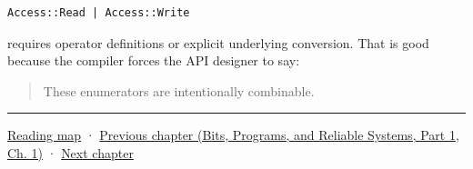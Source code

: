 \begin{verbatim}
Access::Read | Access::Write
\end{verbatim}

requires operator definitions or explicit underlying conversion. That is good because the compiler forces the API designer to say:

\begin{quote}
These enumerators are intentionally combinable.
\end{quote}

\begin{center}\rule{0.5\linewidth}{0.5pt}\end{center}

\hyperref[volume-reading-map]{Reading map} · \href{../01-Bits-Programs-and-Reliable-Systems-P01/main.pdf\#nameddest=01-foundations-i-ch001-from-bits-to-running-systems}{Previous chapter (Bits, Programs, and Reliable Systems, Part 1, Ch. 1)} · \hyperref[01-foundations-i-ch003-records-as-resource-transactions]{Next chapter}
